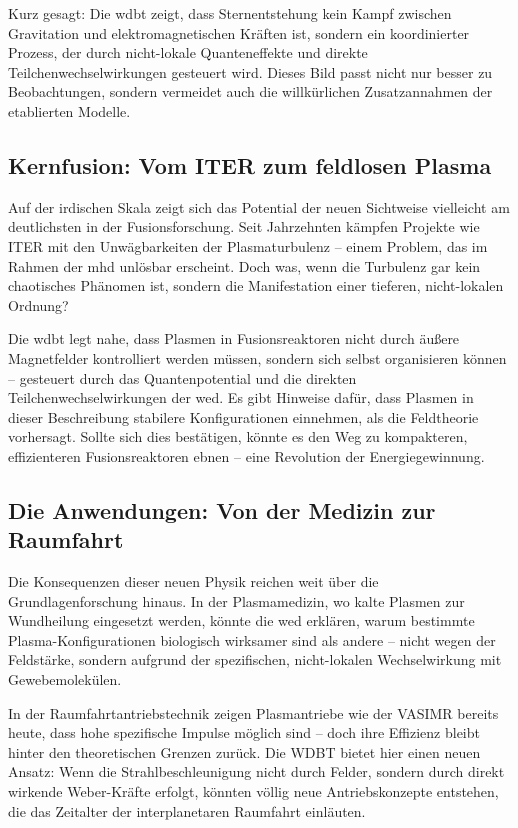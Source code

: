 Kurz gesagt: Die \gls{wdbt} zeigt, dass Sternentstehung kein Kampf zwischen Gravitation und elektromagnetischen Kräften ist, sondern ein koordinierter Prozess, der durch
nicht-lokale Quanteneffekte und direkte Teilchenwechselwirkungen gesteuert wird. Dieses Bild passt nicht nur besser zu Beobachtungen, sondern vermeidet auch die willkürlichen
Zusatzannahmen der etablierten Modelle.

\subsection{Kernfusion: Vom ITER zum feldlosen Plasma}
Auf der irdischen Skala zeigt sich das Potential der neuen Sichtweise vielleicht am deutlichsten in der Fusionsforschung. Seit Jahrzehnten kämpfen Projekte wie ITER mit den
Unwägbarkeiten der Plasmaturbulenz – einem Problem, das im Rahmen der \gls{mhd} unlösbar erscheint. Doch was, wenn die Turbulenz gar kein chaotisches Phänomen ist,
sondern die Manifestation einer tieferen, nicht-lokalen Ordnung?

Die \gls{wdbt} legt nahe, dass Plasmen in Fusionsreaktoren nicht durch äußere Magnetfelder kontrolliert werden müssen, sondern sich selbst organisieren können – gesteuert durch
das Quantenpotential und die direkten Teilchenwechselwirkungen der \gls{wed}. Es gibt Hinweise dafür, dass Plasmen in dieser Beschreibung stabilere Konfigurationen
einnehmen, als die Feldtheorie vorhersagt. Sollte sich dies bestätigen, könnte es den Weg zu kompakteren, effizienteren Fusionsreaktoren ebnen – eine Revolution der Energiegewinnung.

\subsection{Die Anwendungen: Von der Medizin zur Raumfahrt}
Die Konsequenzen dieser neuen Physik reichen weit über die Grundlagenforschung hinaus. In der Plasmamedizin, wo kalte Plasmen zur Wundheilung eingesetzt werden, könnte die
\gls{wed} erklären, warum bestimmte Plasma-Konfigurationen biologisch wirksamer sind als andere – nicht wegen der Feldstärke, sondern aufgrund der spezifischen,
nicht-lokalen Wechselwirkung mit Gewebemolekülen.

In der Raumfahrtantriebstechnik zeigen Plasmantriebe wie der VASIMR bereits heute, dass hohe spezifische Impulse möglich sind – doch ihre Effizienz bleibt hinter den theoretischen
Grenzen zurück. Die WDBT bietet hier einen neuen Ansatz: Wenn die Strahlbeschleunigung nicht durch Felder, sondern durch direkt wirkende Weber-Kräfte erfolgt, könnten völlig neue
Antriebskonzepte entstehen, die das Zeitalter der interplanetaren Raumfahrt einläuten.

